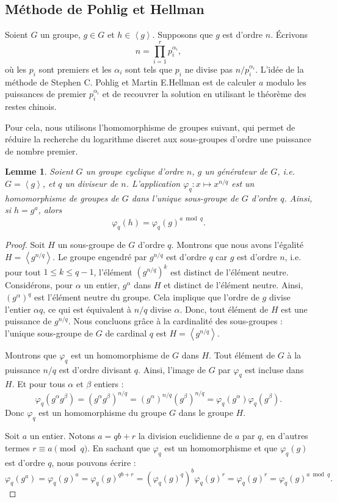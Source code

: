 \documentclass[a4paper, titlepage]{article}
\newtheorem{lemm}[theo]{Lemme}
\theoremstyle{definition}
\theoremstyle{remark}
\def\gen #1{\left\langle#1\right\rangle}
\begin{document}
\subsection{Méthode de Pohlig et Hellman}
\label{methodePohligHellman}
Soient $G$ un groupe, $g\in G$ et $h \in \gen{g}$. Supposons que $g$ est d'ordre $n$. \'Ecrivons $$n = \prod_{i=1}^r p_i^{\alpha_i},$$
où les $p_i$ sont premiers et les $\alpha_i$ sont tels que $p_i$ ne divise pas $n/p_i^{\alpha_i}$.
L'idée de la méthode de Stephen C. Pohlig et Martin E.Hellman \cite{pohligHellman1978} est de calculer $a$ modulo les puissances de premier $p_i^{\alpha_i}$ et de recouvrer la solution en utilisant le théorème des restes chinois.

Pour cela, nous utilisons l'homomorphisme de groupes suivant, qui permet de réduire la recherche du logarithme discret aux sous-groupes d'ordre une puissance de nombre premier.

\begin{lemm}
Soient $G$ un groupe cyclique d'ordre $n$, $g$ un générateur de $G$, i.e. $G = \gen{g}$, et $q$ un diviseur de $n$. L'application $\varphi_q : x \mapsto x^{n/q}$ est un homomorphisme de groupes de $G$ dans l'unique sous-groupe de $G$ d'ordre $q$. Ainsi, si $h = g^a$, alors $$\varphi_q(h) = \varphi_q(g)^{a \bmod{q}}.$$
\end{lemm}

\begin{proof}
Soit $H$ un sous-groupe de $G$ d'ordre $q$. Montrons que nous avons l'égalité $H = \gen{g^{n/q}}$. Le groupe engendré par $g^{n/q}$ est d'ordre $q$ car $g$ est d'ordre $n$, i.e. pour tout $1 \leqslant k \leqslant q-1$, l'élément $(g^{n/q})^k$ est distinct de l'élément neutre.
Considérons, pour $\alpha$ un entier, $g^\alpha$ dans $H$ et distinct de l'élément neutre. Ainsi, $(g^\alpha)^{q}$ est l'élément neutre du groupe. Cela implique que l'ordre de $g$ divise l'entier $\alpha q$, ce qui est équivalent à $n/q$ divise $\alpha$. Donc, tout élément de $H$ est une puissance de $g^{n/q}$. Nous concluons grâce à la cardinalité des sous-groupes : l'unique sous-groupe de $G$ de cardinal $q$ est $H = \gen{g^{n/q}}$.

Montrons que $\varphi_q$ est un homomorphisme de $G$ dans $H$. Tout élément de $G$ à la puissance $n/q$ est d'ordre divisant $q$. Ainsi, l'image de $G$ par $\varphi_q$ est incluse dans $H$. Et pour tous $\alpha$ et $\beta$ entiers :
$$\varphi_q(g^\alpha g^\beta ) = \left(g^\alpha g^\beta \right)^{n/q} = \left(g^\alpha \right)^{n/q}\left(g^\beta \right)^{n/q} = \varphi_q(g^\alpha )\varphi_q(g^\beta ).$$
Donc $\varphi_q$ est un homomorphisme du groupe $G$ dans le groupe $H$.

Soit $a$ un entier. Notons $a = qb + r$ la division euclidienne de $a$ par $q$, en d'autres termes $r \equiv a \pmod{q}$. En sachant que $\varphi_q$ est un homomorphisme et que $\varphi_q(g)$ est d'ordre $q$, nous pouvons écrire :
$$\varphi_q(g^a) = \varphi_q(g)^a = \varphi_q(g)^{qb + r} = \left({\varphi_q(g)^{q}}\right)^{b}\varphi_q(g)^{r} =\varphi_q(g)^{r} = \varphi_q(g)^{a \bmod{q}}.$$
\end{proof}
\end{document}

